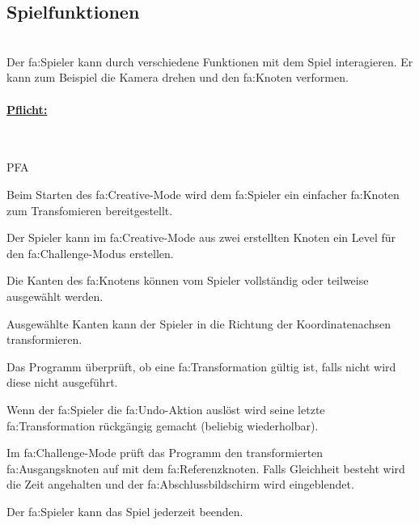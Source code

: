 %
%


\subsection{Spielfunktionen}

%
%
\renewcommand{\K}{}
%
%

~\\
Der \gls{fa:Spieler} kann durch verschiedene Funktionen mit dem Spiel interagieren. Er kann zum Beispiel die Kamera drehen und den \gls{fa:Knoten} verformen. 
\\

%
%
\paragraph*{\underline{Pflicht:}}~\\

\begin{ids}{\gls{PFA\K}}
	 	
 	\id[ 110] Beim Starten des \gls{fa:Creative}-Mode wird dem \gls{fa:Spieler} ein einfacher \gls{fa:Knoten} zum Transfomieren bereitgestellt.
 	
 	\id[ 120] Der Spieler kann im \gls{fa:Creative}-Mode aus zwei erstellten Knoten ein Level für den \gls{fa:Challenge}-Modus erstellen.
 	
 	\id[ 130] Die Kanten des \gls{fa:Knoten}s können vom Spieler vollständig oder teilweise ausgewählt werden.
 	
 	\id[ 140] Ausgewählte Kanten kann der Spieler in die Richtung der Koordinatenachsen transformieren.
 	
 	\id[ 150] Das Programm überprüft, ob eine \gls{fa:Transformation} gültig ist, falls nicht wird diese nicht ausgeführt.
 	
 	\id[ 160] Wenn der \gls{fa:Spieler} die \gls{fa:Undo}-Aktion auslöst wird seine letzte \gls{fa:Transformation} rückgängig gemacht (beliebig wiederholbar). 
 	
 	\id[ 170] Im \gls{fa:Challenge}-Mode prüft das Programm den transformierten \gls{fa:Ausgangsknoten} auf mit dem \gls{fa:Referenzknoten}. Falls Gleichheit besteht wird die Zeit angehalten und der \gls{fa:Abschlussbildschirm} wird eingeblendet.
 	
 	\id[ 180] Der \gls{fa:Spieler} kann das Spiel jederzeit beenden.
	
\end{ids}


